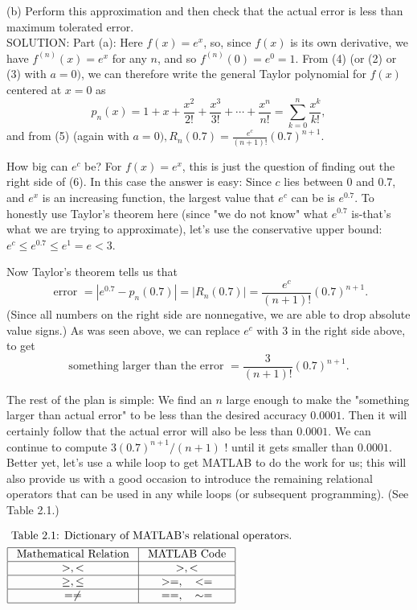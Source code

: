 \documentclass[../main.tex]{subfiles}
\begin{document}
(b) Perform this approximation and then check that the actual error is less than maximum tolerated error.\\

SOLUTION: Part (a): Here $f(x)=e^{x}$, so, since $f(x)$ is its own derivative, we have $f^{(n)}(x)=e^{x}$ for any $n$, and so $f^{(n)}(0)=e^{0}=1$. From (4) (or (2) or (3) with $a=0)$, we can therefore write the general Taylor polynomial for $f(x)$ centered at $x=0$ as
$$
p_{n}(x)=1+x+\frac{x^{2}}{2 !}+\frac{x^{3}}{3 !}+\cdots+\frac{x^{n}}{n !}=\sum_{k=0}^{n} \frac{x^{k}}{k !},
$$
and from (5) (again with $a=0), R_{n}(0.7)=\frac{e^{c}}{(n+1) !}(0.7)^{n+1}$.

How big can $e^{c}$ be? For $f(x)=e^{x}$, this is just the question of finding out the right side of (6). In this case the answer is easy: Since $c$ lies between 0 and 0.7, and $e^{x}$ is an increasing function, the largest value that $e^{c}$ can be is $e^{0.7}$. To honestly use Taylor's theorem here (since "we do not know" what $e^{0.7}$ is-that's what we are trying to approximate), let's use the conservative upper bound: $e^{c} \leq e^{0.7} \leq e^{1}=e<3$.

Now Taylor's theorem tells us that
$$
\text { error }=\left|e^{0.7}-p_{n}(0.7)\right|=\left|R_{n}(0.7)\right|=\frac{e^{c}}{(n+1) !}(0.7)^{n+1} .
$$
(Since all numbers on the right side are nonnegative, we are able to drop absolute value signs.) As was seen above, we can replace $e^{c}$ with 3 in the right side above, to get
$$
\text { something larger than the error }=\frac{3}{(n+1) !}(0.7)^{n+1} \text {. }
$$

The rest of the plan is simple: We find an $n$ large enough to make the "something larger than actual error" to be less than the desired accuracy $0.0001$. Then it will certainly follow that the actual error will also be less than $0.0001$. We can continue to compute $3(0.7)^{n+1} /(n+1)$ ! until it gets smaller than $0.0001$. Better yet, let's use a while loop to get MATLAB to do the work for us; this will also provide us with a good occasion to introduce the remaining relational operators that can be used in any while loops (or subsequent programming). (See Table 2.1.)

$
\begin{aligned}
\centering
&\text { Table 2.1: Dictionary of MATLAB's relational operators. }\\
&\begin{array}{|c|c|}
\hline \text { Mathematical Relation } & \text { MATLAB Code } \\
\hline>,< & >,< \\
\hline \geq, \leq & >=, \quad<= \\
\hline=\neq & ==, \quad \sim= \\
\hline
\end{array}
\end{aligned}
$
\end{document}
